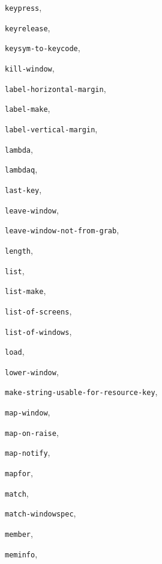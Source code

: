 \begin{theindex}
\item {\tt keypress}, {\bf\pageref{keypress}}
\item {\tt keyrelease}, {\bf\pageref{keyrelease}}
\item {\tt keysym-to-keycode}, {\bf\pageref{keysym-to-keycode}}
\item {\tt kill-window}, {\bf\pageref{kill-window}}
\item {\tt label-horizontal-margin}, {\bf\pageref{label-horizontal-margin}}
\item {\tt label-make}, {\bf\pageref{label-make}}
\item {\tt label-vertical-margin}, {\bf\pageref{label-vertical-margin}}
\item {\tt lambda}, {\bf\pageref{lambda}}
\item {\tt lambdaq}, {\bf\pageref{lambdaq}}
\item {\tt last-key}, {\bf\pageref{last-key}}
\item {\tt leave-window}, {\bf\pageref{leave-window}}
\item {\tt leave-window-not-from-grab}, {\bf\pageref{leave-window-not-from-grab}}
\item {\tt length}, {\bf\pageref{length}}
\item {\tt list}, {\bf\pageref{list}}
\item {\tt list-make}, {\bf\pageref{list-make}}
\item {\tt list-of-screens}, {\bf\pageref{list-of-screens}}
\item {\tt list-of-windows}, {\bf\pageref{list-of-windows}}
\item {\tt load}, {\bf\pageref{load}}
\item {\tt lower-window}, {\bf\pageref{lower-window}}
\item {\tt make-string-usable-for-resource-key}, {\bf\pageref{make-string-usable-for-resource-key}}
\item {\tt map-window}, {\bf\pageref{map-window}}
\item {\tt map-on-raise}, {\bf\pageref{map-on-raise}}
\item {\tt map-notify}, {\bf\pageref{map-notify}}
\item {\tt mapfor}, {\bf\pageref{mapfor}}
\item {\tt match}, {\bf\pageref{match}}
\item {\tt match-windowspec}, {\bf\pageref{match-windowspec}}
\item {\tt member}, {\bf\pageref{member}}
\item {\tt meminfo}, {\bf\pageref{meminfo}}

\end{theindex}
